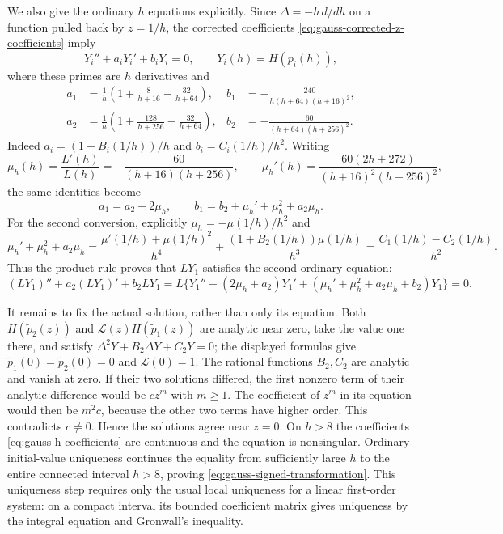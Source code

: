 \documentclass[11pt,a4paper]{article}
\begin{document}
We also give the ordinary $h$ equations explicitly.  Since
$\Delta=-h\,d/dh$ on a function pulled back by $z=1/h$, the corrected
coefficients \eqref{eq:gauss-corrected-z-coefficients} imply
\begin{equation}\label{eq:gauss-h-equations}
 Y_i''+a_iY_i'+b_iY_i=0,\qquad Y_i(h)=H(p_i(h)),
\end{equation}
where these primes are $h$ derivatives and
\begin{equation}\label{eq:gauss-h-coefficients}
\begin{aligned}
 a_1&=\frac1h\left(1+\frac8{h+16}-\frac{32}{h+64}\right),&
 b_1&=-\frac{240}{h(h+64)(h+16)^2},\\
 a_2&=\frac1h\left(1+\frac{128}{h+256}-\frac{32}{h+64}\right),&
 b_2&=-\frac{60}{(h+64)(h+256)^2}.
\end{aligned}
\end{equation}
Indeed $a_i=(1-B_i(1/h))/h$ and $b_i=C_i(1/h)/h^2$.
Writing
\begin{equation}\label{eq:gauss-h-lambda}
 \mu_h(h)=\frac{L'(h)}{L(h)}
      =-\frac{60}{(h+16)(h+256)},
 \qquad
 \mu_h'(h)=\frac{60(2h+272)}{(h+16)^2(h+256)^2},
\end{equation}
the same identities become
\begin{equation}\label{eq:gauss-h-gauge-identities}
 a_1=a_2+2\mu_h,
 \qquad b_1=b_2+\mu_h'+\mu_h^2+a_2\mu_h.
\end{equation}
For the second conversion, explicitly
$\mu_h=-\mu(1/h)/h^2$ and
\[
 \mu_h'+\mu_h^2+a_2\mu_h
 =\frac{\mu'(1/h)+\mu(1/h)^2}{h^4}
   +\frac{(1+B_2(1/h))\mu(1/h)}{h^3}
 =\frac{C_1(1/h)-C_2(1/h)}{h^2}.
\]
Thus the product rule proves that $LY_1$ satisfies the second
ordinary equation:
\[
 (LY_1)''+a_2(LY_1)'+b_2LY_1
 =L\{Y_1''+(2\mu_h+a_2)Y_1'
          +(\mu_h'+\mu_h^2+a_2\mu_h+b_2)Y_1\}=0.
\]

It remains to fix the actual solution, rather than only its equation.
Both $H(\widetilde p_2(z))$ and
$\mathcal L(z)H(\widetilde p_1(z))$ are analytic near zero, take the
value one there, and satisfy
$\Delta^2Y+B_2\Delta Y+C_2Y=0$; the displayed formulas give
$\widetilde p_1(0)=\widetilde p_2(0)=0$ and $\mathcal L(0)=1$.
The rational functions $B_2,C_2$
are analytic and vanish at zero.  If their two solutions differed,
the first nonzero term of their analytic difference would be
$cz^m$ with $m\geq1$.  The coefficient of $z^m$ in its equation
would then be $m^2c$, because the other two terms have higher order.
This contradicts $c\ne0$.  Hence the solutions agree near $z=0$.
On $h>8$ the coefficients \eqref{eq:gauss-h-coefficients} are
continuous and the equation is nonsingular.  Ordinary initial-value
uniqueness continues the equality from sufficiently large $h$ to
the entire connected interval $h>8$, proving
\eqref{eq:gauss-signed-transformation}.  This uniqueness step requires
only the usual local uniqueness for a linear first-order system:
on a compact interval its bounded coefficient matrix gives uniqueness
by the integral equation and Gronwall's inequality.
\end{document}
